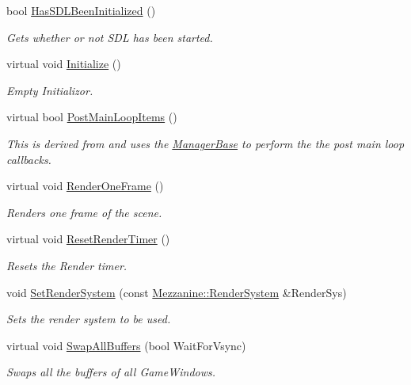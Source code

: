 \begin{DoxyCompactItemize}
bool \hyperlink{classMezzanine_1_1GraphicsManager_a952bc45c1efc78c2508e81f38fe5527d}{HasSDLBeenInitialized} ()
\begin{DoxyCompactList}\small\item\em Gets whether or not SDL has been started. \item\end{DoxyCompactList}\item 
virtual void \hyperlink{classMezzanine_1_1GraphicsManager_a4f76a6a37be800b1fc13195aa11cfd7a}{Initialize} ()
\begin{DoxyCompactList}\small\item\em Empty Initializor. \item\end{DoxyCompactList}\item 
virtual bool \hyperlink{classMezzanine_1_1GraphicsManager_a73d12091631749914d4a1025c45d68b4}{PostMainLoopItems} ()
\begin{DoxyCompactList}\small\item\em This is derived from and uses the \hyperlink{classMezzanine_1_1ManagerBase}{ManagerBase} to perform the the post main loop callbacks. \item\end{DoxyCompactList}\item 
\hypertarget{classMezzanine_1_1GraphicsManager_a10f3355d7a2212f302da3353de108b1c}{
virtual void \hyperlink{classMezzanine_1_1GraphicsManager_a10f3355d7a2212f302da3353de108b1c}{RenderOneFrame} ()}
\label{classMezzanine_1_1GraphicsManager_a10f3355d7a2212f302da3353de108b1c}

\begin{DoxyCompactList}\small\item\em Renders one frame of the scene. \item\end{DoxyCompactList}\item 
virtual void \hyperlink{classMezzanine_1_1GraphicsManager_adf7b2ba6879fdde8d00d3a6899b32fcc}{ResetRenderTimer} ()
\begin{DoxyCompactList}\small\item\em Resets the Render timer. \item\end{DoxyCompactList}\item 
void \hyperlink{classMezzanine_1_1GraphicsManager_ae110dcf1ddad03c6ef14b2cc2d06f5b8}{SetRenderSystem} (const \hyperlink{namespaceMezzanine_a1bb0347c37954bc71c4344e4b55c729a}{Mezzanine::RenderSystem} \&RenderSys)
\begin{DoxyCompactList}\small\item\em Sets the render system to be used. \item\end{DoxyCompactList}\item 
virtual void \hyperlink{classMezzanine_1_1GraphicsManager_a0509833a248adebd2316ae79cc9d007a}{SwapAllBuffers} (bool WaitForVsync)
\begin{DoxyCompactList}\small\item\em Swaps all the buffers of all GameWindows. \item\end{DoxyCompactList}\end{DoxyCompactItemize}
